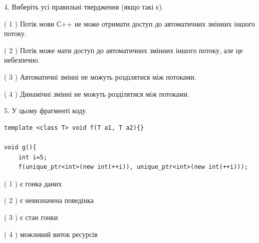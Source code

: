 \documentclass[12pt, ukrainian]{article}
\begin{document}
\begin {large}
{%
4. Виберіть усі правильні твердження (якщо такі є).\par
\vspace{2mm}

( 1 ) Потік мови С++ не може отримати доступ до автоматичних змінних іншого потоку.%

( 2 ) Потік може мати доступ до автоматичних змінних іншого потоку, але це небезпечно.%

( 3 ) Автоматичні змінні не можуть розділятися між потоками.%

( 4 ) Динамічні змінні не можуть розділятися між потоками.%


5. У цьому фрагменті коду
\begin{verbatim}
template <class T> void f(T a1, T a2){}

void g(){
    int i=5;
    f(unique_ptr<int>(new int(++i)), unique_ptr<int>(new int(++i)));
\end{verbatim}

( 1 ) є гонка даних%

( 2 ) є невизначена поведінка%

( 3 ) є стан гонки%

( 4 ) можливий виток ресурсів%
}
\end {large}
\end{document}
